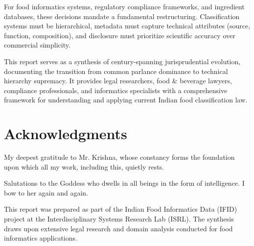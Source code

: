 \documentclass[12pt,a4paper]{article}
\begin{document}
For food informatics systems, regulatory compliance frameworks, and ingredient databases, these decisions mandate a fundamental restructuring. Classification systems must be hierarchical, metadata must capture technical attributes (source, function, composition), and disclosure must prioritize scientific accuracy over commercial simplicity.

This report serves as a synthesis of century-spanning jurisprudential evolution, documenting the transition from common parlance dominance to technical hierarchy supremacy. It provides legal researchers, food \& beverage lawyers, compliance professionals, and informatics specialists with a comprehensive framework for understanding and applying current Indian food classification law.

\section*{Acknowledgments}

My deepest gratitude to Mr. Krishna, whose constancy forms the foundation upon which all my work, including this, quietly rests.

Salutations to the Goddess who dwells in all beings in the form of intelligence. I bow to her again and again.

This report was prepared as part of the Indian Food Informatics Data (IFID) project at the Interdisciplinary Systems Research Lab (ISRL). The synthesis draws upon extensive legal research and domain analysis conducted for food informatics applications.
\end{document}
